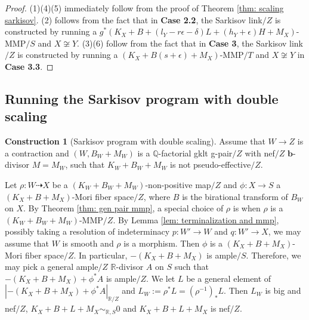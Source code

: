 \documentclass[11pt]{amsart}
\numberwithin{equation}{section}
\newcommand{\bb}{\bm{b}}
\newcommand{\Qq}{\mathbb{Q}}
\newcommand{\Rr}{\mathbb{R}}
\theoremstyle{definition}
\newtheorem{cons}[thm]{Construction}
\theoremstyle{remark}
\theoremstyle{definition}
\begin{document}
\begin{proof}
(1)(4)(5) immediately follow from the proof of Theorem \ref{thm: scaling sarkisov}. (2) follows from the fact that in \textbf{\rm\textbf{Case 2.2}}, the Sarkisov link$/Z$ is constructed by running a $g^*(K_X+B+(l_Y-r\epsilon-\delta)L+(h_Y+\epsilon)H+M_X)$-MMP$/S$ and $X\not\cong Y$. (3)(6) follow from the fact that in \textbf{\rm\textbf{Case 3}}, the Sarkisov link$/Z$ is constructed by running a $(K_X+B(s+\epsilon)+M_X)$-MMP$/T$ and $X\not\cong Y$ in \textbf{\rm\textbf{Case 3.3}}.
\end{proof}

\subsection{Running the Sarkisov program with double scaling}
\begin{cons}[Sarkisov program with double scaling]\label{cons: sarkisov scaling}
Assume that $W\rightarrow Z$ is a contraction and $(W,B_W+M_W)$ is a $\Qq$-factorial gklt g-pair$/Z$ with nef$/Z$ $\bb$-divisor $M=M_W$, such that $K_W+B_W+M_W$ is not pseudo-effective$/Z$.

Let $\rho: W\dashrightarrow X$ be a $(K_W+B_W+M_W)$-non-positive map$/Z$ and $\phi: X\rightarrow S$ a $(K_X+B+M_X)$-Mori fiber space$/Z$, where $B$ is the birational transform of $B_W$ on $X$. By Theorem \ref{thm: gen pair mmp}, a special choice of $\rho$ is when $\rho$ is a $(K_W+B_W+M_W)$-MMP$/Z$. By Lemma \ref{lem: terminalization and mmp}, possibly taking a resolution of indeterminacy $p:W'\rightarrow W$ and $q:W'\rightarrow X$, we may assume that $W$ is smooth and $\rho$ is a morphism. 
 Then $\phi$ is a $(K_{X}+B+M_{X})$-Mori fiber space$/Z$. In particular, $-(K_{X}+B+M_{X})$ is ample$/S$. Therefore, we may pick a general ample$/Z$ $\Rr$-divisor $A$ on $S$ such that $-(K_{X}+B+M_{X})+\phi^*A$ is ample$/Z$. We let $L$ be a general element of $|-(K_{X}+B+M_{X})+\phi^*A|_{\Rr/Z}$ and $L_W:=\rho^*L=(\rho^{-1})_*L$. Then $L_W$ is big and nef$/Z$, $K_{X}+B+L+M_X\sim_{\Rr,S}0$ and $K_{X}+B+L+M_{X}$ is nef$/Z$.
 

\end{cons}
\end{document}
